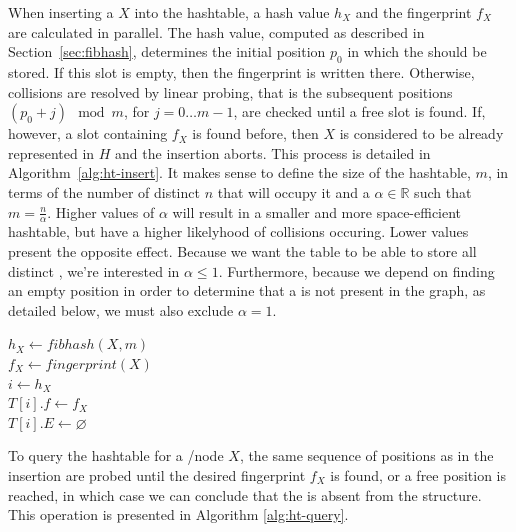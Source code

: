 When inserting a \kmer $X$ into the hashtable, a hash value $h_X$ and the fingerprint $f_X$ are calculated in parallel. The hash value, computed as described in Section~\ref{sec:fibhash}, determines the initial position $p_0$ in which the \kmer should be stored. If this slot is empty, then the fingerprint is written there. Otherwise, collisions are resolved by linear probing, that is the subsequent positions $(p_0+j)\mod m$, for $j=0\ldots m-1$, are checked until a free slot is found. If, however, a slot containing $f_X$ is found before, then $X$ is considered to be already represented in $H$ and the insertion aborts. This process is detailed in Algorithm~\ref{alg:ht-insert}. It makes sense to define the size of the hashtable, $m$, in terms of the number of distinct  $n$ that will occupy it and a  $\alpha \in \mathbb{R}$ such that $m = \frac{n}{\alpha}$. Higher values of $\alpha$ will result in a smaller and more space-efficient hashtable, but have a higher likelyhood of collisions occuring. Lower values present the opposite effect. Because we want the table to be able to store all distinct , we're interested in $\alpha \leq 1$. Furthermore, because we depend on finding an empty position in order to determine that a \kmer is not present in the graph, as detailed below, we must also exclude $\alpha = 1$.

\begin{algorithm}
	\caption{$T.\mathit{insert}(X$)}\label{alg:ht-insert}
	$h_X \gets \mathit{fibhash}(X, m)$\\
	$f_X \gets \mathit{fingerprint}(X)$\\
	$i \gets h_X$\\
	$T[i].f\gets f_X$\\
	$T[i].E\gets \varnothing$\\
\end{algorithm}

To query the hashtable for a \kmer/node $X$, the same sequence of positions as in the insertion are probed until the desired fingerprint $f_X$ is found, or a free position is reached, in which case we can conclude that the \kmer is absent from the structure. This operation is presented in Algorithm \ref{alg:ht-query}.


